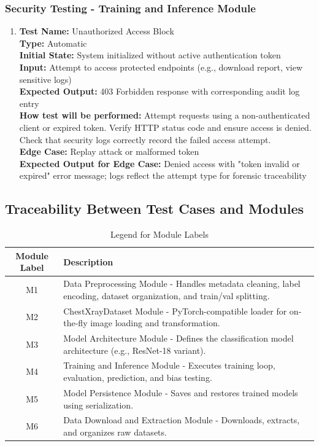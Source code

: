 \documentclass[12pt, titlepage]{article}
\begin{document}
\subsubsection{Security Testing - Training and Inference Module}

\begin{enumerate}
  \item \textbf{Test Name:} Unauthorized Access Block \\
  \textbf{Type:} Automatic \\
  \textbf{Initial State:} System initialized without active authentication token \\
  \textbf{Input:} Attempt to access protected endpoints (e.g., download report, view sensitive logs) \\
  \textbf{Expected Output:} 403 Forbidden response with corresponding audit log entry \\
  \textbf{How test will be performed:} Attempt requests using a non-authenticated client or expired token. Verify HTTP status code and ensure access is denied. Check that security logs correctly record the failed access attempt. \\
  \textbf{Edge Case:} Replay attack or malformed token \\
  \textbf{Expected Output for Edge Case:} Denied access with "token invalid or expired" error message; logs reflect the attempt type for forensic traceability \\
\end{enumerate}


\subsection{Traceability Between Test Cases and Modules}

\begin{table}[h!]
  \centering
  \caption{Legend for Module Labels}
  \begin{tabular}{|c|p{}|}
    \hline
    \textbf{Module Label} & \textbf{Description} \\
    \hline
    M1 & Data Preprocessing Module - Handles metadata cleaning, label encoding, dataset organization, and train/val splitting. \\
    \hline
    M2 & ChestXrayDataset Module - PyTorch-compatible loader for on-the-fly image loading and transformation. \\
    \hline
    M3 & Model Architecture Module - Defines the classification model architecture (e.g., ResNet-18 variant). \\
    \hline
    M4 & Training and Inference Module - Executes training loop, evaluation, prediction, and bias testing. \\
    \hline
    M5 & Model Persistence Module - Saves and restores trained models using serialization. \\
    \hline
    M6 & Data Download and Extraction Module - Downloads, extracts, and organizes raw datasets. \\
    \hline
  \end{tabular}
\end{table}
\end{document}
